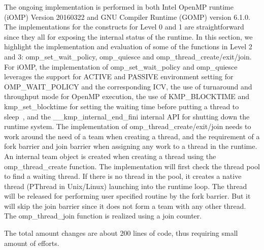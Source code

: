 The ongoing implementation is performed in both Intel OpenMP runtime (iOMP) Version 20160322 and GNU Compiler Runtime (GOMP) version 6.1.0. The implementations for 
the constructs for Level 0 and 1 are straightforward since they all for exposing the internal status of the runtime. In this section, 
we highlight the implementation and evaluation of some of the functions in Level 2 and 3: 
{\sf omp\_set\_wait\_policy}, {\sf omp\_quiesce} and {\sf omp\_thread\_create/exit/join}. 
For iOMP, the implementation of {\sf omp\_set\_wait\_policy} and {\sf omp\_quiesce} leverages the support for {\sf ACTIVE} and {\sf PASSIVE}
environment setting for {\sf OMP\_WAIT\_POLICY} and the corresponding ICV, the use of turnaround and throughput mode for OpenMP execution, the 
use of {\sf KMP\_BLOCKTIME} and {\sf kmp\_set\_blocktime} for setting the waiting time before putting a thread to sleep~\cite{iccmanual}, 
and the {\sf \_\_kmp\_internal\_end\_fini} internal API for shutting down the runtime system. 
The implementation of  {\sf omp\_thread\_create/exit/join} needs to work around the need of a team when creating a thread, and the requirement 
of a fork barrier and join barrier when assigning any work to a thread in the runtime. An internal team object is created when creating a thread 
using the {\sf omp\_thread\_create} function. The implementation will first check the thread pool to find a waiting thread. If there is no thread
in the pool, it creates a native thread (PThread in Unix/Linux) launching into the runtime loop. The thread will be released for performing
user specified routine by the fork barrier. But it will skip the join barrier since it does not form a team with any other thread. 
The {\sf omp\_thread\_join} function is realized using a join counter. 

The total amount changes are about 200 lines of code, thus requiring small amount of efforts.  

